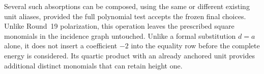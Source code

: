 Several such absorptions can be composed, using the same or different
existing unit aliases, provided the full polynomial test accepts the
frozen final choices. Unlike Round~19 polarization, this operation leaves
the prescribed square monomials in the incidence graph untouched. Unlike
a formal substitution $d=a$ alone, it does not insert a coefficient $-2$
into the equality row before the complete energy is considered. Its
quartic product with an already anchored unit provides additional distinct
monomials that can retain height one.
